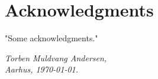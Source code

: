 \chapter{Acknowledgments}

"Some acknowledgments."


\vspace{2ex}
\begin{flushright}
  \emph{Torben Muldvang Andersen,}\\
  \emph{Aarhus, \today.}
\end{flushright}

\cleardoublepage{}

